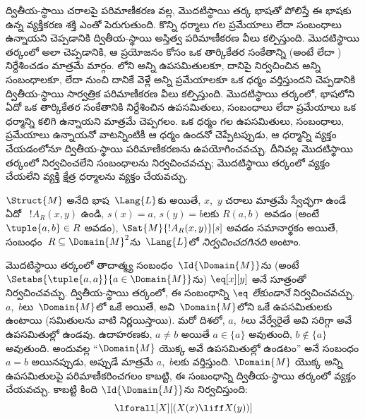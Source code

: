 \documentclass[../../../include/open-logic-section]{subfiles}
\begin{document}

\begin{explain}
ద్వితీయ-స్థాయి చరాలపై పరిమాణీకరణ వల్ల, మొదటిస్థాయి తర్క భాషతో
పోలిస్తే ఈ భాషకు ఉన్న వ్యక్తీకరణ శక్తి ఎంతో పెరుగుతుంది. కొన్ని ధర్మాలు గల ప్రమేయాలు లేదా
సంబంధాలు ఉన్నాయని చెప్పడానికి ద్వితీయ-స్థాయి అస్తిత్వ పరిమాణీకరణ వీలు
కల్పిస్తుంది. మొదటిస్థాయి తర్కంలో అలా చెప్పడానికి, ఆ ప్రయోజనం కోసం
ఒక తార్కికేతర సంకేతాన్ని (అంటే  లేదా
) నిర్దేశించడం మాత్రమే మార్గం. 
లోని అన్ని ఉపసమితులకూ, దానిపై నిర్వచించిన అన్ని సంబంధాలకూ, లేదా 
నుంచి దానికే వెళ్లే అన్ని ప్రమేయాలకూ ఒక ధర్మం వర్తిస్తుందని
చెప్పడానికి ద్వితీయ-స్థాయి సార్వత్రిక పరిమాణీకరణ వీలు కల్పిస్తుంది.
మొదటిస్థాయి తర్కంలో, భాషలోని ఏదో ఒక తార్కికేతర సంకేతానికి నిర్దేశించిన
ఉపసమితులు, సంబంధాలు లేదా ప్రమేయాలు ఒక ధర్మాన్ని కలిగి ఉన్నాయని మాత్రమే
చెప్పగలం. ఒక ధర్మం గల ఉపసమితులు, సంబంధాలు, ప్రమేయాలు ఉన్నాయనో
వాటన్నింటికీ ఆ ధర్మం ఉందనో చెప్పేటప్పుడు, ఆ ధర్మాన్ని వ్యక్తం చేయడంలోనూ
ద్వితీయ-స్థాయి పరిమాణీకరణను ఉపయోగించవచ్చు. దీనివల్ల మొదటిస్థాయి
తర్కంలో నిర్వచించలేని సంబంధాలను నిర్వచించవచ్చు; మొదటిస్థాయి తర్కంలో
వ్యక్తం చేయలేని వ్యక్తి క్షేత్ర ధర్మాలను వ్యక్తం చేయవచ్చు.
\end{explain}

\begin{defn}
$\Struct{M}$ అనేది భాష~$\Lang{L}$కు  అయితే,
$x$,~$y$ చరాలు మాత్రమే స్వేచ్ఛగా ఉండే ఏదో ~$!A_R(x, y)$
ఉండి, $s(x) = a$, $s(y) = b$లకు $R(a, b)$ అవడం (అంటే
$\tuple{a,b} \in R$ అవడం), $\Sat{M}{!A_R(x, y)}[s]$ అవడం సమానార్థకం
అయితే, సంబంధం~$R \subseteq \Domain{M}^2$ను~$\Lang{L}$లో
\emph{నిర్వచించదగినది} అంటాం.
\end{defn}

\begin{ex}
మొదటిస్థాయి తర్కంలో తాదాత్మ్య సంబంధం~$\Id{\Domain{M}}$ను (అంటే
$\Setabs{\tuple{a,a}}{a \in \Domain{M}}$ను) $\eq[x][y]$ అనే
సూత్రంతో నిర్వచించవచ్చు. ద్వితీయ-స్థాయి తర్కంలో, ఈ సంబంధాన్ని
\emph{$\eq$ లేకుండానే} నిర్వచించవచ్చు. $a$,~$b$లు~$\Domain{M}$లో
ఒకే  అయితే, అవి~$\Domain{M}$లోని ఒకే ఉపసమితులకు
 ఉంటాయి (సమితులను వాటి 
నిర్ణయిస్తాయి). మరో దిశలో, $a$,~$b$లు వేర్వేరైతే అవి సరిగ్గా అవే
ఉపసమితుల్లో  ఉండవు. ఉదాహరణకు, $a \neq b$ అయితే
$a \in \{a\}$ అవుతుంది, $b \notin \{a\}$ అవుతుంది. అందువల్ల
``$\Domain{M}$ యొక్క అవే ఉపసమితుల్లో  ఉండటం'' అనే
సంబంధం $a = b$ అయినప్పుడు, అప్పుడే మాత్రమే $a$,~$b$లకు వర్తిస్తుంది.
$\Domain{M}$ యొక్క అన్ని ఉపసమితులపై పరిమాణీకరించగలం కాబట్టి, ఈ
సంబంధాన్ని ద్వితీయ-స్థాయి తర్కంలో వ్యక్తం చేయవచ్చు. కాబట్టి కింది
 $\Id{\Domain{M}}$ను నిర్వచిస్తుంది:
\[
\lforall[X][(X(x) \liff X(y))]
\]
\end{ex}
\end{document}
